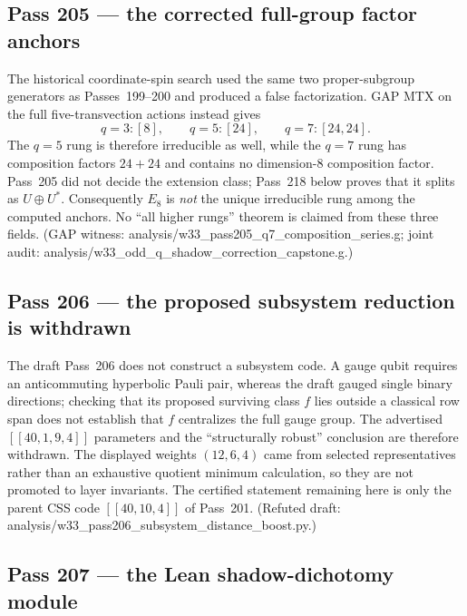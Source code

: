\documentclass[12pt,a4paper]{article}
\def\texttt#1{#1}%
\theoremstyle{definition}
\begin{document}
\subsection{Pass 205 --- the corrected full-group factor anchors}
\label{ssec:pass205}

The historical coordinate-spin search used the same two proper-subgroup
generators as Passes~199--200 and produced a false factorization.  GAP MTX
on the full five-transvection actions instead gives
\[
  \boxed{q=3:[8],\qquad q=5:[24],\qquad q=7:[24,24].}
\]
The $q=5$ rung is therefore irreducible as well, while the $q=7$ rung has
composition factors $24+24$ and contains no dimension-$8$ composition factor.
Pass~205 did not decide the extension class; Pass~218 below proves that it
splits as $U\oplus U^*$.
Consequently $E_8$ is \emph{not} the unique irreducible rung among the
computed anchors.  No ``all higher rungs'' theorem is claimed from these
three fields. (GAP witness:
\texttt{analysis/w33\_pass205\_q7\_composition\_series.g}; joint audit:
\texttt{analysis/w33\_odd\_q\_shadow\_correction\_capstone.g}.)

\subsection{Pass 206 --- the proposed subsystem reduction is withdrawn}
\label{ssec:pass206}

The draft Pass~206 does not construct a subsystem code.  A gauge qubit
requires an anticommuting hyperbolic Pauli pair, whereas the draft gauged
single binary directions; checking that its proposed surviving class $f$
lies outside a classical row span does not establish that $f$ centralizes
the full gauge group.  The advertised
$[[40,1,9,4]]$ parameters and the ``structurally robust'' conclusion are
therefore withdrawn.  The displayed weights $(12,6,4)$ came from selected
representatives rather than an exhaustive quotient minimum calculation,
so they are not promoted to layer invariants.  The certified statement
remaining here is only the parent CSS code $[[40,10,4]]$ of Pass~201.
(Refuted draft:
\texttt{analysis/w33\_pass206\_subsystem\_distance\_boost.py}.)

\subsection{Pass 207 --- the Lean shadow-dichotomy module}
\label{ssec:pass207}
\end{document}
